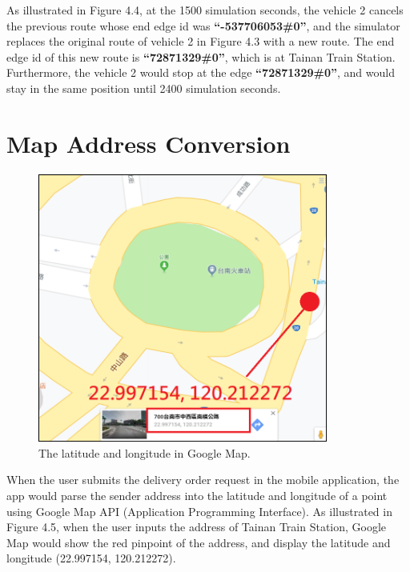 \documentclass[12pt]{ksthesis}
\begin{document}
\begin{thesis}
{As illustrated in Figure 4.4, at the 1500 simulation seconds, the vehicle 2 cancels the previous route whose end edge id was \textbf{“-537706053\#0”}, and the simulator replaces the original route of vehicle 2 in Figure 4.3 with a new route. The end edge id of this new route is \textbf{“72871329\#0”}, which is at Tainan Train Station. Furthermore, the vehicle 2 would stop at the edge \textbf{“72871329\#0”}, and would stay in the same position until 2400 simulation seconds.



\section{Map Address Conversion}

\begin{figure}[H]
\centering
\includegraphics[width=0.85\textwidth]{./Thesis_figures/F4-5_GPS_googleMap.PNG}
\caption{\large The latitude and longitude in Google Map.}
\vspace{0.5cm}
\label{Fig:GPS_in_GoggleMap}
\end{figure}


When the user submits the delivery order request in the mobile application, the app would parse the sender address into the latitude and longitude of a point using Google Map API (Application Programming Interface).
As illustrated in Figure 4.5, when the user inputs the address of Tainan Train Station, Google Map would show the red pinpoint of the address, and display the latitude and longitude (22.997154, 120.212272).

}
\end{thesis}
\end{document}
